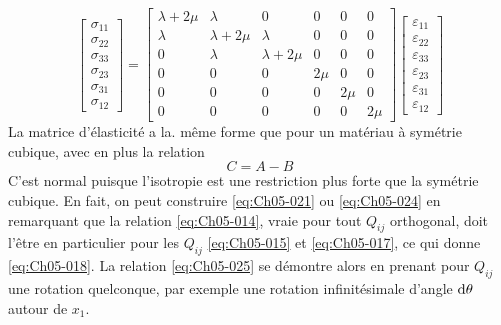 \begin{equation}
    \begin{bmatrix}
        \sigma_{11}\\
        \sigma_{22}\\
        \sigma_{33}\\
        \sigma_{23}\\
        \sigma_{31}\\
        \sigma_{12}
    \end{bmatrix}
    =
    \begin{bmatrix}
        \lambda+2\mu & \lambda      & 0            & 0    & 0    & 0 \\
        \lambda      & \lambda+2\mu & \lambda      & 0    & 0    & 0 \\
        0            & \lambda      & \lambda+2\mu & 0    & 0    & 0 \\
        0            & 0            & 0            & 2\mu & 0    & 0 \\
        0            & 0            & 0            & 0    & 2\mu & 0 \\
        0            & 0            & 0            & 0    & 0    & 2\mu
    \end{bmatrix}
    \begin{bmatrix}
        \varepsilon_{11}\\
        \varepsilon_{22}\\
        \varepsilon_{33}\\
        \varepsilon_{23}\\
        \varepsilon_{31}\\
        \varepsilon_{12}
    \end{bmatrix}
    \label{eq:Ch05-024}
\end{equation}
La matrice d'élasticité a la. même forme que pour un matériau à symétrie cubique, avec en plus la relation 
\begin{equation}
	C = A-B
	\label{eq:Ch05-025}
\end{equation}
C'est normal puisque l'isotropie est une restriction plus forte que la symétrie cubique.
En fait, on peut construire \eqref{eq:Ch05-021} ou \eqref{eq:Ch05-024} en remarquant que la relation \eqref{eq:Ch05-014}, vraie pour tout $Q_{ij}$ orthogonal, doit l'être en particulier pour les $Q_{ij}$ \eqref{eq:Ch05-015} et \eqref{eq:Ch05-017}, ce qui donne \eqref{eq:Ch05-018}.
La relation \eqref{eq:Ch05-025} se démontre alors en prenant pour $Q_{ij}$ une rotation quelconque, par exemple une rotation infinitésimale d'angle $\mathrm{d} \theta$ autour de $x_1$. 


